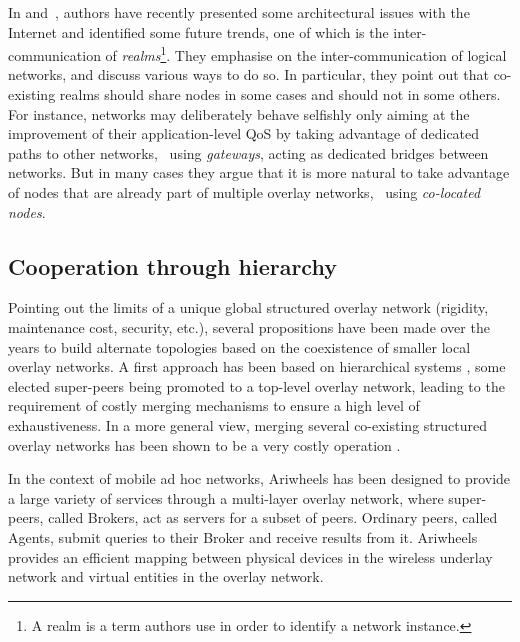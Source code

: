 

In \cite{siekkinen_beyondfuture_2007}
and~\cite{fonte_interdomain_2008}, authors have recently presented
some architectural issues with the Internet and identified some future
trends, one of which is the inter-communication of
\emph{realms}\footnote{A realm is a term authors use in order to
  identify a network instance.}. They emphasise on the
inter-communication of logical networks, and discuss various ways to
do so. In particular, they point out that co-existing realms should
share nodes in some cases and should not in some others. For instance,
networks may deliberately behave selfishly only aiming at the
improvement of their application-level QoS by taking advantage of
dedicated paths to other networks, \ie\ using \textit{gateways},
acting as dedicated bridges between networks. But in many cases they
argue that it is more natural to take advantage of nodes that are
already part of multiple overlay networks, \ie\ using \emph{co-located
  nodes}.

\subsection{Cooperation through hierarchy}
Pointing out the limits of a unique global structured overlay network
(rigidity, maintenance cost, security, etc.), several propositions
have been made over the years to build alternate topologies based on
the coexistence of smaller local overlay networks. A first approach
has been based on hierarchical systems \cite{Biersack,XuMH03}, some
elected super-peers being promoted to a top-level overlay network,
leading to the requirement of costly merging mechanisms to ensure a
high level of exhaustiveness. In a more general view, merging several
co-existing structured overlay networks has been shown to be a very
costly operation \cite{Datta,Haridi}.

In the context of mobile ad hoc networks, Ariwheels
\cite{BCCL08,LBCC08} has been designed to provide a large variety of
services through a multi-layer overlay network, where super-peers,
called Brokers, act as servers for a subset of peers.  Ordinary peers,
called Agents, submit queries to their Broker and receive results from
it. Ariwheels provides an efficient mapping between physical devices
in the wireless underlay network and virtual entities in the overlay
network.

